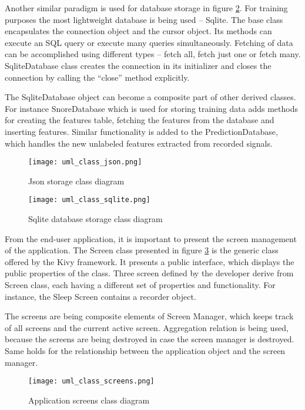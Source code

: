 Another similar paradigm is used for database storage in figure \ref{fig:umlsqlite}. For training purposes the most lightweight database is being used -- Sqlite. The base class encapsulates the connection object and the cursor object. Its methods can execute an SQL query or execute many queries simultaneously. Fetching of data can be accomplished using different types -- fetch all, fetch just one or fetch many. SqliteDatabase class creates the connection in its initializer and closes the connection by calling the ``close'' method explicitly.

The SqliteDatabase object can become a composite part of other derived classes. For instance SnoreDatabase which is used for storing training data adds methods for creating the features table, fetching the features from the database and inserting features. Similar functionality is added to the PredictionDatabase, which handles the new unlabeled features extracted from recorded signals.

\begin{figure}[!ht]
\centering
  \texttt{[image: uml\_class\_json.png]}
\caption{Json storage class diagram}
\label{fig:umljson}
\end{figure}

\vspace{5mm}

\begin{figure}[!ht]
\centering
  \texttt{[image: uml\_class\_sqlite.png]}
\caption{Sqlite database storage class diagram}
\label{fig:umlsqlite}
\end{figure}

From the end-user application, it is important to present the screen management of the application. The Screen class presented in figure \ref{fig:umlscreens} is the generic class offered by the Kivy framework. It presents a public interface, which displays the public properties of the class. Three screen defined by the developer derive from Screen class, each having a different set of properties and functionality. For instance, the Sleep Screen contains a recorder object. 

The screens are being composite elements of Screen Manager, which keeps track of all screens and the current active screen. Aggregation relation is being used, because the screens are being destroyed in case the screen manager is destroyed. Same holds for the relationship between the application object and the screen manager.

\begin{figure}[!ht]
\centering
  \texttt{[image: uml\_class\_screens.png]}
\caption{Application screens class diagram}
\label{fig:umlscreens}
\end{figure}

